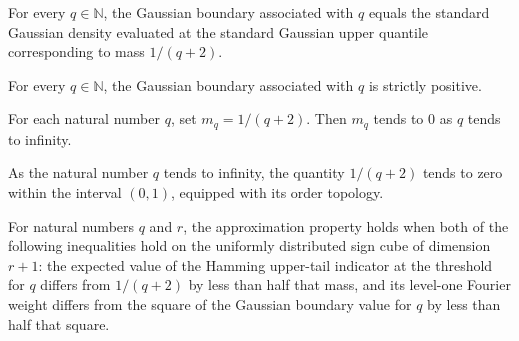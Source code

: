 \begin{theorem}
\label{FABL.fknOptimalityGaussianBoundary_eq_density}
\leanok
{}
For every $q\in\mathbb{N}$, the Gaussian boundary associated with $q$ equals the
standard Gaussian density evaluated at the standard Gaussian upper quantile
corresponding to mass $1/(q+2)$.
\end{theorem}

\begin{theorem}
\label{FABL.fknOptimalityGaussianBoundary_pos}
\leanok
{}
For every $q\in\mathbb{N}$, the Gaussian boundary associated with $q$ is strictly
positive.
\end{theorem}

\begin{theorem}
\label{FABL.tendsto_fknOptimalityGaussianMass_zero}
\leanok
{}
For each natural number $q$, set $m_q=1/(q+2)$. Then $m_q$ tends to $0$ as $q$ tends to
infinity.
\end{theorem}

\begin{theorem}
\label{FABL.tendsto_fknOptimalityGaussianMass_atBot}
\leanok
{}
As the natural number $q$ tends to infinity, the quantity $1/(q+2)$ tends to zero within
the interval $(0,1)$, equipped with its order topology.
\end{theorem}

\begin{definition}
\label{FABL.IsFKNOptimalityApproximation}
\leanok
{}
For natural numbers $q$ and $r$, the approximation property holds when both of the
following inequalities hold on the uniformly distributed sign cube of dimension $r+1$:
the expected value of the Hamming upper-tail indicator at the threshold for $q$ differs
from $1/(q+2)$ by less than half that mass, and its level-one Fourier weight differs
from the square of the Gaussian boundary value for $q$ by less than half that square.
\end{definition}

